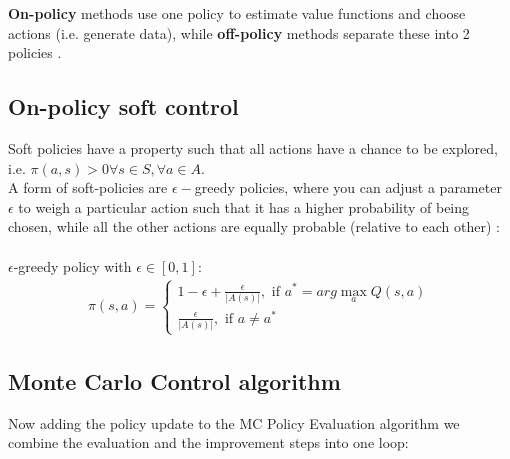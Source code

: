 

\textbf{On-policy} methods use one policy to estimate value functions and choose actions (i.e. generate data), while \textbf{off-policy} methods separate these into 2 policies \cite{lecture_mfc}. 

\subsection{On-policy soft control}

Soft policies have a property such that all actions have a chance to be explored, i.e. $\pi(a, s) > 0 \forall s \in S, \forall a \in A.$\\

A form of soft-policies are $\epsilon-$greedy policies, where 
you can adjust a parameter $\epsilon$ to weigh a particular action such that it has a higher probability of being chosen,
while all the other actions are equally probable (relative to each other) \cite{lecture_mfc}:\\\\
$\epsilon$-greedy policy with $\epsilon \in [0, 1]$:
\begin{align}
    \pi(s, a) = \begin{cases} 
        1 - \epsilon + \frac{\epsilon}{|A(s)|}, \text{ if } a^{*} = arg \max_{a} Q(s, a) \\
        \frac{\epsilon}{|A(s)|}, \text{ if }  a \neq a^*
    \end{cases}   
\end{align}

\subsection{Monte Carlo Control algorithm}

Now adding the policy update to the MC Policy Evaluation algorithm we combine the evaluation and the improvement steps into one loop:

